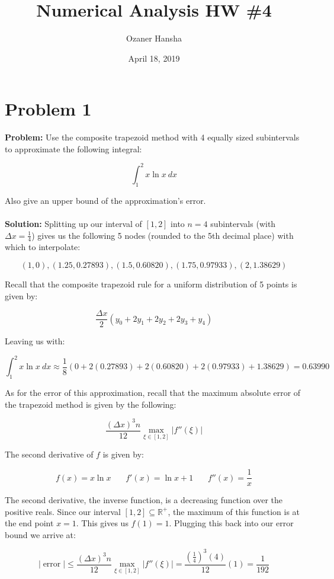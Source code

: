 \documentclass{article}
\begin{document}
\title{Numerical Analysis HW \#4}
\author{Ozaner Hansha}
\date{April 18, 2019}
\maketitle

\section*{Problem 1}
\textbf{Problem:} Use the composite trapezoid method with 4 equally sized subintervals to approximate the following integral:

$$\int^2_1 x\ln x\ dx$$

Also give an upper bound of the approximation's error.
\\\\
\textbf{Solution:} Splitting up our interval of $[1,2]$ into $n=4$ subintervals (with $\Delta x =\frac{1}{4}$) gives us the following 5 nodes (rounded to the 5th decimal place) with which to interpolate:

$$\left(1,0\right), \left(1.25,0.27893\right), \left(1.5,0.60820\right), \left(1.75,0.97933\right), \left(2,1.38629\right)$$

Recall that the composite trapezoid rule for a uniform distribution of 5 points is given by:

$$\frac{\Delta x}{2}\left(y_0+2y_1+2y_2+2y_3+y_4\right)$$

Leaving us with:

$$\int^2_1 x\ln x\ dx\approx\frac{1}{8}\left(0+2(0.27893)+2(0.60820)+2(0.97933)+1.38629\right)=\boxed{0.63990}$$

As for the error of this approximation, recall that the maximum absolute error of the trapezoid method is given by the following:

$$\frac{(\Delta x)^3n}{12}\max_{\xi\in[1,2]}|f''(\xi)|$$

The second derivative of $f$ is given by:

$$f(x)=x\ln x\ \ \ \ \ \ \ \  f'(x)=\ln x + 1\ \ \ \ \ \ \ \  f''(x)=\frac{1}{x}$$

The second derivative, the inverse function, is a decreasing function over the positive reals. Since our interval $[1,2]\subseteq\mathbb R^+$, the maximum of this function is at the end point $x=1$. This gives us $f(1)=1$. Plugging this back into our error bound we arrive at:

$$|\operatorname{error}|\le \frac{(\Delta x)^3n}{12}\max_{\xi\in[1,2]}|f''(\xi)|=\frac{\left(\frac{1}{4}\right)^3(4)}{12}(1)=\boxed{\frac{1}{192}}$$
\end{document}
